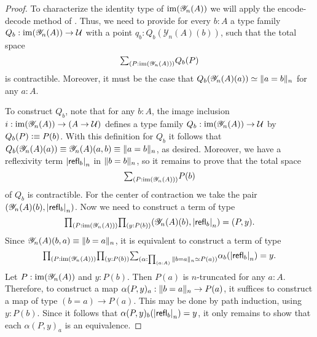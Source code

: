 \begin{proof}
To characterize the identity type of $\im(\mathscr{Y}_n(A))$ we will apply
the encode-decode method of \cite{LicataShulman}. Thus, we need to provide for every $b:A$ a type 
family $Q_b:\im(\mathscr{Y}_n(A))\to\UU$ with a point $q_b:Q_b(\mathscr{Y}_n(A)(b))$,
such that the total space
\begin{equation*}
\sm{P:\im(\mathscr{Y}_n(A))} Q_b(P)
\end{equation*}
is contractible. Moreover, it must be the case that $\eqv{Q_b(\mathscr{Y}_n(A)(a))}{\trunc{n}{a=b}}$ for any $a:A$. 

To construct $Q_b$, note that for any $b:A$, the image inclusion $i:\im(\mathscr{Y}_n(A))\to (A\to\UU)$ defines 
a type family $Q_b:\im(\mathscr{Y}_n(A))\to\UU$ by $Q_b(P)\defeq P(b)$. With this definition for $Q_b$ it follows that $Q_b(\mathscr{Y}_n(A)(a))\jdeq\mathscr{Y}_n(A)(a,b)\jdeq\trunc{n}{a=b}$, as desired. Moreover, we have a reflexivity term $\tproj{n}{\refl{b}}$ in $\trunc{n}{b=b}$, so it remains to prove that the total space 
\begin{equation*}
\sm{P:\im(\mathscr{Y}_n(A))}P(b)
\end{equation*}
of $Q_b$ is contractible. For the center of contraction we take the pair
$\pairr{\mathscr{Y}_n(A)(b),\tproj{n}{\refl{b}}}$.
Now we need to construct a term of type
\begin{equation*}
\prd{P:\im(\mathscr{Y}_n(A))}{y:P(b)} \pairr{\mathscr{Y}_n(A)(b),\tproj{n}{\refl{b}}}=\pairr{P,y}.
\end{equation*}
Since $\mathscr{Y}_n(A)(b,a)\jdeq\trunc{n}{b=a}$, it is equivalent to construct a term of type
\begin{equation*}
\prd{P:\im(\mathscr{Y}_n(A))}{y:P(b)}\sm{\alpha:\prd{a:A} \eqv{\trunc{n}{b=a}}{P(a)}} \alpha_b(\tproj{n}{\refl{b}})=y.
\end{equation*}
Let $P:\im(\mathscr{Y}_n(A))$ and $y:P(b)$. Then $P(a)$ is $n$-truncated for any $a:A$. Therefore, to construct a map
$\alpha(P,y)_a:\trunc{n}{b=a}\to P(a)$, it suffices to construct a map of type $(b=a)\to P(a)$. This may be done by
path induction, using $y:P(b)$. Since it follows that $\alpha(P,y)_b(\tproj{n}{\refl{b}})=y$, it only remains to show that each $\alpha(P,y)_a$ is an equivalence.  


\end{proof}
